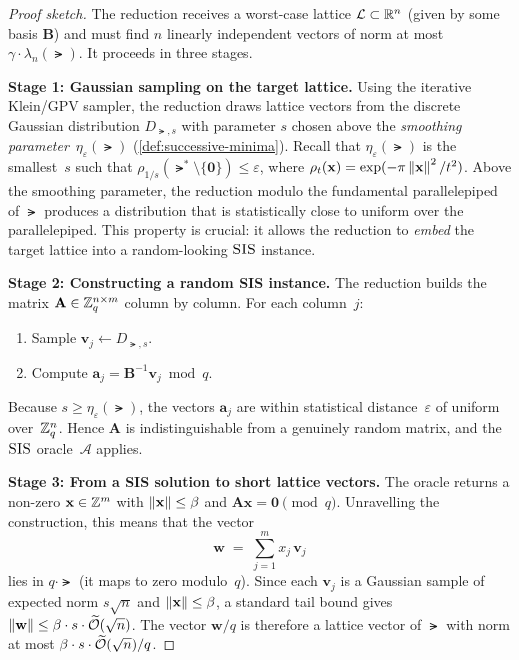 \begin{proof}[Proof sketch]
The reduction receives a worst-case lattice $\mathcal{L} \subset \mathbb{R}^n$
(given by some basis $\mathbf{B}$) and must find $n$ linearly
independent vectors of norm at most
$\gamma \cdot \lambda_n(\lat)$.  It proceeds in three stages.

\medskip\noindent\textbf{Stage 1: Gaussian sampling on the
target lattice.}
Using the iterative Klein/GPV sampler, the reduction draws
lattice vectors from the discrete Gaussian distribution
$D_{\lat, s}$ with parameter $s$ chosen above the
\emph{smoothing parameter}~$\eta_\varepsilon(\lat)$
(\cref{def:successive-minima}).
Recall that $\eta_\varepsilon(\lat)$ is the smallest~$s$ such
that
$\rho_{1/s}(\lat^* \setminus \{\mathbf{0}\}) \leq \varepsilon$,
where $\rho_t(\mathbf{x}) = \exp(-\pi \left\lVert \mathbf{x} \right\rVert^2 / t^2)$.
Above the smoothing parameter, the reduction modulo the
fundamental parallelepiped of $\lat$ produces a distribution
that is statistically close to uniform over the parallelepiped.
This property is crucial: it allows the reduction to
\emph{embed} the target lattice into a random-looking
$\textsc{SIS}$ instance.

\medskip\noindent\textbf{Stage 2: Constructing a random SIS
instance.}
The reduction builds the matrix $\mathbf{A} \in \mathbb{Z}_q^{n \times m}$
column by column.  For each column~$j$:
\begin{enumerate}
\item Sample $\mathbf{v}_j \leftarrow D_{\lat, s}$.
\item Compute
  $\mathbf{a}_j = \mathbf{B}^{-1} \mathbf{v}_j \bmod q$.
\end{enumerate}
Because $s \geq \eta_\varepsilon(\lat)$, the vectors
$\mathbf{a}_j$ are within statistical distance~$\varepsilon$ of
uniform over~$\mathbb{Z}_q^n$.  Hence $\mathbf{A}$ is
indistinguishable from a genuinely random matrix, and the
$\textsc{SIS}$ oracle~$\mathcal{A}$ applies.

\medskip\noindent\textbf{Stage 3: From a SIS solution to short
lattice vectors.}
The oracle returns a non-zero $\mathbf{x} \in \mathbb{Z}^m$ with
$\left\lVert \mathbf{x} \right\rVert \leq \beta$ and
$\mathbf{A}\mathbf{x} = \mathbf{0} \pmod{q}$.
Unravelling the construction, this means that the vector
\begin{equation}
\mathbf{w} \;=\; \sum_{j=1}^{m} x_j \, \mathbf{v}_j
\end{equation}
lies in $q \cdot \lat$ (it maps to zero modulo~$q$).
Since each $\mathbf{v}_j$ is a Gaussian sample of expected norm
$s\sqrt{n}$ and $\left\lVert \mathbf{x} \right\rVert \leq \beta$, a standard
tail bound gives
$\left\lVert \mathbf{w} \right\rVert \leq \beta \cdot s \cdot \widetilde{\mathcal{O}}(\sqrt{n})$.
The vector $\mathbf{w}/q$ is therefore a lattice vector of
$\lat$ with norm at most
$\beta \cdot s \cdot \widetilde{\mathcal{O}}(\sqrt{n}) / q$.


\end{proof}
